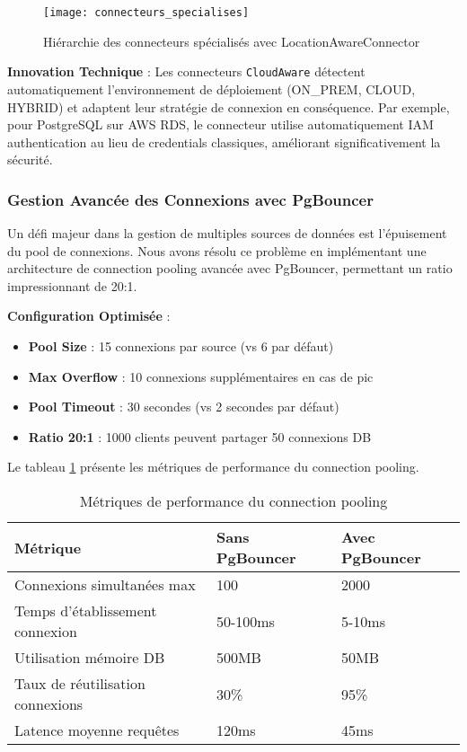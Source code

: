 \begin{figure}[htpb]
\centering
\texttt{[image: connecteurs\_specialises]}
\caption{Hiérarchie des connecteurs spécialisés avec LocationAwareConnector}
\label{fig:connecteurs_specialises}
\end{figure}

\textbf{Innovation Technique} : Les connecteurs \texttt{CloudAware} détectent automatiquement l'environnement de déploiement (ON\_PREM, CLOUD, HYBRID) et adaptent leur stratégie de connexion en conséquence. Par exemple, pour PostgreSQL sur AWS RDS, le connecteur utilise automatiquement IAM authentication au lieu de credentials classiques, améliorant significativement la sécurité.

\subsubsection{Gestion Avancée des Connexions avec PgBouncer}

Un défi majeur dans la gestion de multiples sources de données est l'épuisement du pool de connexions. Nous avons résolu ce problème en implémentant une architecture de connection pooling avancée avec PgBouncer, permettant un ratio impressionnant de 20:1.

\textbf{Configuration Optimisée} :
\begin{itemize}
    \item \textbf{Pool Size} : 15 connexions par source (vs 6 par défaut)
    \item \textbf{Max Overflow} : 10 connexions supplémentaires en cas de pic
    \item \textbf{Pool Timeout} : 30 secondes (vs 2 secondes par défaut)
    \item \textbf{Ratio 20:1} : 1000 clients peuvent partager 50 connexions DB
\end{itemize}

Le tableau \ref{tab:metriques_pooling} présente les métriques de performance du connection pooling.

\begin{table}[htpb]
\centering
\caption{Métriques de performance du connection pooling}
\label{tab:metriques_pooling}
\begin{tabular}{|p{}|p{}|p{}|}
\hline
\textbf{Métrique} & \textbf{Sans PgBouncer} & \textbf{Avec PgBouncer} \\
\hline
Connexions simultanées max & 100 & 2000 \\
\hline
Temps d'établissement connexion & 50-100ms & 5-10ms \\
\hline
Utilisation mémoire DB & 500MB & 50MB \\
\hline
Taux de réutilisation connexions & 30\% & 95\% \\
\hline
Latence moyenne requêtes & 120ms & 45ms \\
\hline
\end{tabular}
\end{table}

